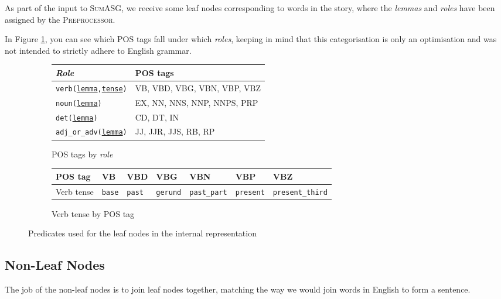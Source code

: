 As part of the input to \textsc{SumASG}, we receive some leaf nodes corresponding to words in the story, where the \textit{lemmas} and \textit{roles} have been assigned by the \textsc{Preprocessor}.

In Figure \ref{fig:leaf_nodes}, you can see which POS tags fall under which \textit{roles}, keeping in mind that this categorisation is only an optimisation and was not intended to strictly adhere to English grammar.

\begin{figure}[H]
\begin{subfigure}{\textwidth}
\centering
\begin{tabular}{@{}ll@{}}
\toprule
\textit{Role}         & POS tags                    \\ \midrule
\texttt{verb(\underline{lemma},\underline{tense})}         & VB, VBD, VBG, VBN, VBP, VBZ \\
\texttt{noun(\underline{lemma})}         & EX, NN, NNS, NNP, NNPS, PRP \\
\texttt{det(\underline{lemma})}          & CD, DT, IN                  \\
\texttt{adj\_or\_adv(\underline{lemma})} & JJ, JJR, JJS, RB, RP        \\ \bottomrule
\end{tabular}
\caption{POS tags by \textit{role}}
\vspace{\baselineskip}
\end{subfigure}
\begin{subfigure}{\textwidth}
\centering
\begin{tabular}{@{}lllllll@{}}
\toprule
POS tag  & VB & VBD  & VBG    & VBN        & VBP     & VBZ            \\ \midrule
Verb tense & \texttt{base} & \texttt{past} & \texttt{gerund} & \texttt{past\_part} & \texttt{present} & \texttt{present\_third} \\ \bottomrule
\end{tabular}
\caption{Verb tense by POS tag}
\end{subfigure}
\caption{Predicates used for the leaf nodes in the internal representation}
\label{fig:leaf_nodes}
\end{figure}

\subsection{Non-Leaf Nodes}

The job of the non-leaf nodes is to join leaf nodes together, matching the way we would join words in English to form a sentence.


